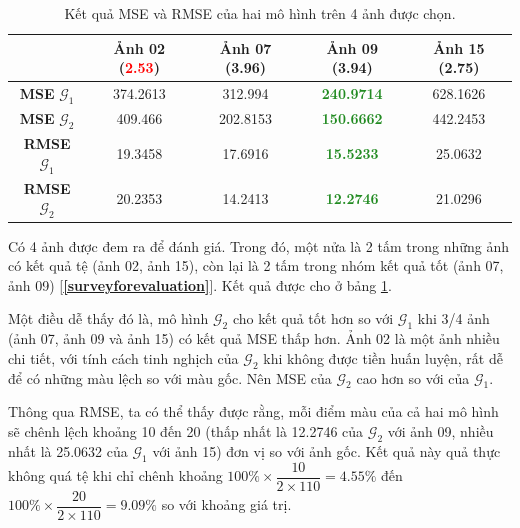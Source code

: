 \documentclass[a4paper, 12pt]{report}
\begin{document}
\begin{table}[!h]
\centering
\begin{tabular}{c|c|c|c|c|}
\cline{2-5}
                                    & \textbf{Ảnh 02 (\textcolor{red}{\textbf{2.53}})}  & \textbf{Ảnh 07 (\textcolor{JungleGreen}{\textbf{3.96}})}  & \textbf{Ảnh 09 (\textcolor{JungleGreen}{\textbf{3.94}})}  & \textbf{Ảnh 15 (\textcolor{Mahogany}{\textbf{2.75}})}  \\ \hline
\multicolumn{1}{|c|}{\textbf{MSE} $\mathcal{G}_1$}  & 374.2613         & 312.994          & \textcolor{ForestGreen}{\textbf{240.9714}}         & 628.1626         \\ \hline
\multicolumn{1}{|c|}{\textbf{MSE} $\mathcal{G}_2$}  & 409.466          & 202.8153         & \textcolor{ForestGreen}{\textbf{150.6662}}         & 442.2453         \\ \hline
\multicolumn{1}{|c|}{\textbf{RMSE} $\mathcal{G}_1$} & 19.3458          & 17.6916          & \textcolor{ForestGreen}{\textbf{15.5233}}          & 25.0632          \\ \hline
\multicolumn{1}{|c|}{\textbf{RMSE} $\mathcal{G}_2$} & 20.2353          & 14.2413          & \textcolor{ForestGreen}{\textbf{12.2746}}          & 21.0296          \\ \hline
\end{tabular}
\caption{Kết quả MSE và RMSE của hai mô hình trên 4 ảnh được chọn.}
\label{tab:msermse}
\end{table}

Có 4 ảnh được đem ra để đánh giá.
Trong đó, một nửa là 2 tấm trong những ảnh có kết quả tệ (ảnh 02, ảnh 15), còn lại là 2 tấm trong nhóm kết quả tốt (ảnh 07, ảnh 09) [\textbf{\ref{surveyforevaluation}}].
Kết quả được cho ở bảng \ref{tab:msermse}.\vspace{5pt}

Một điều dễ thấy đó là, mô hình $\mathcal{G}_2$ cho kết quả tốt hơn so với $\mathcal{G}_1$ khi 3/4 ảnh (ảnh 07, ảnh 09 và ảnh 15) có kết quả MSE thấp hơn.
Ảnh 02 là một ảnh nhiều chi tiết, với tính cách tinh nghịch của $\mathcal{G}_2$ khi không được tiền huấn luyện, rất dễ để có những màu lệch so với màu gốc.
Nên MSE của $\mathcal{G}_2$ cao hơn so với của $\mathcal{G}_1$.\vspace{5pt}

Thông qua RMSE, ta có thể thấy được rằng, mỗi điểm màu của cả hai mô hình sẽ chênh lệch khoảng 10 đến 20 (thấp nhất là 12.2746 của $\mathcal{G}_2$ với ảnh 09, nhiều nhất là 25.0632 của $\mathcal{G}_1$ với ảnh 15) đơn vị so với ảnh gốc.
Kết quả này quả thực không quá tệ khi chỉ chênh khoảng $100\% \times \dfrac{10}{2\times 110} = 4.55 \%$ đến $100\% \times \dfrac{20}{2\times 110} = 9.09 \%$ so với khoảng giá trị.
\end{document}
